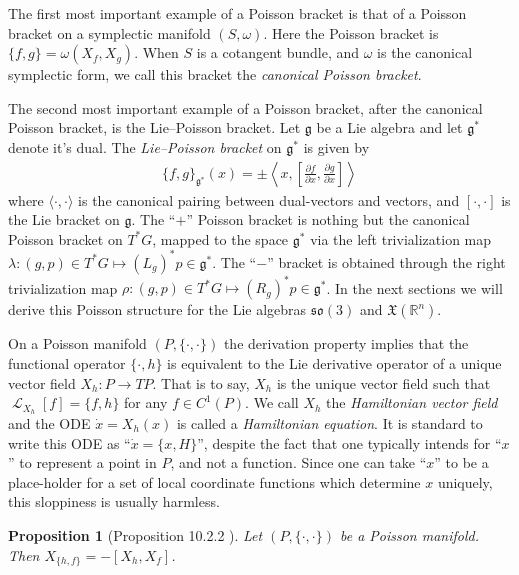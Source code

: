 \documentclass[12pt]{amsart}
\newcommand{\pder}[2]{\ensuremath{\frac{\partial #1}{\partial #2}}}
\newcommand{\so}{\ensuremath{\mathfrak{so}}}
\newtheorem{prop}[thm]{Proposition}
\DeclareMathOperator{\lie}{\mathcal{L}}
\begin{document}
The first most important example of a Poisson bracket is
that of a Poisson bracket on a symplectic manifold $(S,\omega)$.
Here the Poisson bracket is $\{ f , g \} = \omega( X_f , X_g )$.
When $S$ is a cotangent bundle, and $\omega$ is the canonical
symplectic form, we call this bracket the \emph{canonical Poisson
bracket}.

The second most important example of a Poisson bracket,
after the canonical Poisson bracket,
is the Lie--Poisson bracket.  Let $\mathfrak{g}$ be a Lie algebra
and let $\mathfrak{g}^*$ denote it's dual.
The \emph{Lie--Poisson bracket} on $\mathfrak{g}^*$ is given 
by
\begin{align}
  \{ f , g \}_{\mathfrak{g}^*}( x ) = \pm
  \left \langle x , \left[ \pder{f}{x} , \pder{g}{x} \right] \right \rangle
  \label{eq:Lie-Poisson}
\end{align}
where $\langle \cdot , \cdot \rangle$ is the canonical pairing between
dual-vectors and vectors, and $[ \cdot , \cdot ]$ is the Lie bracket
on $\mathfrak{g}$.
The ``$+$'' Poisson bracket is nothing but the canonical Poisson bracket on $T^*G$,
mapped to the space $\mathfrak{g}^*$ via the left trivialization map $\lambda: (g,p) \in T^*G \mapsto (L_g)^*p \in \mathfrak{g}^*$.
The ``$-$'' bracket is obtained through the right trivialization map
$\rho:(g,p) \in T^*G \mapsto (R_g)^*p \in \mathfrak{g}^*$.
In the next sections we will derive this Poisson structure for the 
Lie algebras $\so(3)$ and $\mathfrak{X}(\mathbb{R}^n)$.


On a Poisson manifold $(P,\{ \cdot , \cdot \})$
the derivation property implies that the functional operator
$\{ \cdot , h \}$ is equivalent
to the Lie derivative operator of a unique vector field $X_h:P \to TP$.
That is to say, $X_h$ is the unique vector field such that $\lie_{X_h}[f] = \{ f , h \}$ for any $f \in C^1(P)$.
We call $X_h$ the \emph{Hamiltonian vector field} and the ODE $\dot{x} = X_h(x)$ is called a \emph{Hamiltonian equation}.
It is standard to write this ODE as ``$\dot{x} = \{ x , H\}$'',
despite the fact that one typically intends for ``$x$'' to represent
a point in $P$, and not a function.
Since one can take ``$x$'' to be a place-holder for a set of
local coordinate functions which determine $x$ uniquely, this
sloppiness is usually harmless.

\begin{prop}[Proposition 10.2.2 \cite{MandS}] \label{prop:Lie_hom}
  Let $(P,\{ \cdot , \cdot \})$ be a Poisson manifold.
  Then $X_{ \{ h ,f \} } = - [X_h , X_f ]$.
\end{prop}
\end{document}
